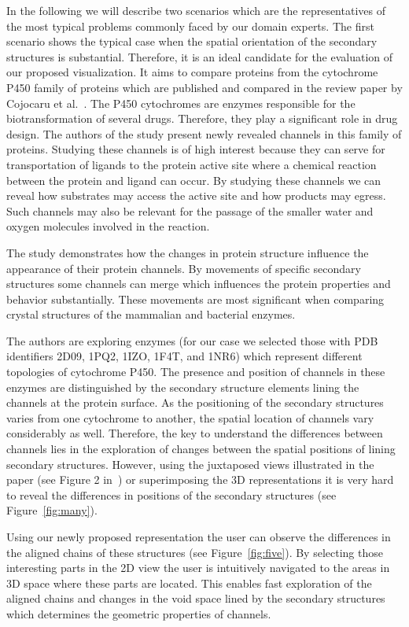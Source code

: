 \documentclass[twocolumn]{bmcart}%
\begin{document}
In the following we will describe two scenarios which are the representatives of the most typical problems commonly faced by our domain experts.
The first scenario shows the typical case when the spatial orientation of the secondary structures is substantial.
Therefore, it is an ideal candidate for the evaluation of our proposed visualization.
It aims to compare proteins from the cytochrome P450 family of proteins which are published and compared in the review paper by Cojocaru et al.~\cite{Cojocaru2007}. 
The P450 cytochromes are enzymes responsible for the biotransformation of several drugs.
Therefore, they play a significant role in drug design.
The authors of the study present newly revealed channels in this family of proteins.
Studying these channels is of high interest because they can serve for transportation of ligands to the protein active site where a chemical reaction between the protein and ligand can occur.
By studying these channels we can reveal how substrates may access the active site and how products may egress. 
Such channels may also be relevant for the passage of the smaller water and oxygen molecules involved in the reaction. 

The study demonstrates how the changes in protein structure influence the appearance of their protein channels.
By movements of specific secondary structures some channels can merge which influences the protein properties and behavior substantially.
These movements are most significant when comparing crystal structures of the mammalian and bacterial enzymes.

The authors are exploring enzymes (for our case we selected those with PDB identifiers 2D09, 1PQ2, 1IZO, 1F4T, and 1NR6) which represent different topologies of cytochrome P450. 
The presence and position of channels in these enzymes are distinguished by the secondary structure elements lining the channels at the protein surface. 
As the positioning of the secondary structures varies from one cytochrome to another, the spatial location of channels vary considerably as well.
Therefore, the key to understand the differences between channels lies in the exploration of changes between the spatial positions of lining secondary structures.
However, using the juxtaposed views illustrated in the paper (see Figure 2 in~\cite{Cojocaru2007}) or superimposing the 3D representations it is very hard to reveal the differences in positions of the secondary structures (see Figure~\ref{fig:many}).

Using our newly proposed representation the user can observe the differences in the aligned chains of these structures (see Figure~\ref{fig:five}).
By selecting those interesting parts in the 2D view the user is intuitively navigated to the areas in 3D space where these parts are located.
This enables fast exploration of the aligned chains and changes in the void space lined by the secondary structures which determines the geometric properties of channels.
\end{document}
